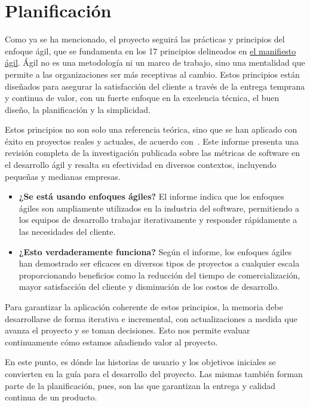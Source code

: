 \chapter{Planificación}

Como ya se ha mencionado, el proyecto seguirá las prácticas y principios del enfoque ágil, que se fundamenta en los 17 principios delineados en \href{https://agilemanifesto.org/iso/es/manifesto.html}{el manifiesto ágil}. Ágil no es una metodología ni un marco de trabajo, sino una mentalidad que permite a las organizaciones ser más receptivas al cambio. Estos principios están diseñados para asegurar la satisfacción del cliente a través de la entrega temprana y continua de valor, con un fuerte enfoque en la excelencia técnica, el buen diseño, la planificación y la simplicidad.

Estos principios no son solo una referencia teórica, sino que se han aplicado con éxito en proyectos reales y actuales, de acuerdo con~\cite{berlas2024software}. Este informe presenta una revisión completa de la investigación publicada sobre las métricas de software en el desarrollo ágil y resalta su efectividad en diversos contextos, incluyendo pequeñas y medianas empresas.

\begin{itemize}
    \item \textbf{¿Se está usando enfoques ágiles?} El informe indica que los enfoques ágiles son ampliamente utilizados en la industria del software, permitiendo a los equipos de desarrollo trabajar iterativamente y responder rápidamente a las necesidades del cliente.
    \item \textbf{¿Esto verdaderamente funciona?} Según el informe, los enfoques ágiles han demostrado ser eficaces en diversos tipos de proyectos a cualquier escala proporcionando beneficios como la reducción del tiempo de comercialización, mayor satisfacción del cliente y disminución de los costos de desarrollo.
\end{itemize}    

Para garantizar la aplicación coherente de estos principios, la memoria debe desarrollarse de forma iterativa e incremental, con actualizaciones a medida que avanza el proyecto y se toman decisiones. Esto nos permite evaluar continuamente cómo estamos añadiendo valor al proyecto.

En este punto, es dónde las historias de usuario y los objetivos iniciales se convierten en la guía para el desarrollo del proyecto. Las mismas también forman parte de la planificación, pues, son las que garantizan la entrega y calidad continua de un producto.

